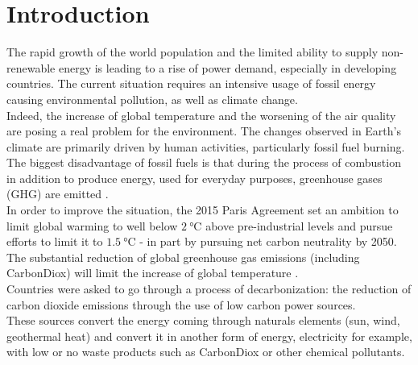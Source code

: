 \chapter{Introduction}

%
The rapid growth of the world population and the limited ability to supply non-renewable energy is leading to a rise of power demand, especially in developing countries. The current situation requires an intensive usage of fossil energy causing environmental pollution, as well as climate change. \\

Indeed, the increase of global temperature and the worsening of the air quality are posing a real problem for the environment. The changes observed in Earth’s climate are primarily driven by human activities, particularly fossil fuel burning. The biggest disadvantage of fossil fuels is that during the process of combustion in addition to produce energy, used for everyday purposes, greenhouse gases (\gls{GHG}) are emitted \cite{greenhousegasemissions}. \\

In order to improve the situation, the 2015 Paris Agreement set an ambition to limit global warming to well below $\SI{2}{\degreeCelsius}$ above pre-industrial levels and pursue efforts to limit it to $\SI{1.5}{\degreeCelsius}$ - in part by pursuing net carbon neutrality by 2050. The substantial reduction of global greenhouse gas emissions (including \gls{CarbonDiox})  will limit the increase of global temperature \cite{french_conference}. \\
Countries were asked to go through a process of decarbonization: the reduction of carbon dioxide emissions through the use of low carbon power sources. \\
These sources convert the energy coming through naturals elements (sun, wind, geothermal heat) and convert it in another form of energy, electricity for example, with low or no waste products such as \gls{CarbonDiox} or other chemical pollutants. \\

